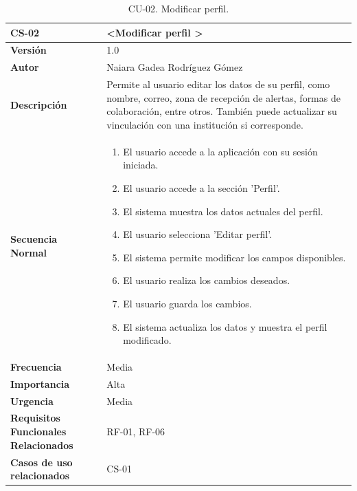 \begin{table}[htbp] %
\centering
\begin{tabular}{ |m{3cm}|m{11cm}|  } 
\hline
\cellcolor[HTML]{B9E3F0}\centering\textbf{CS-02} & \cellcolor[HTML]{B9E3F0}\textbf{\textless Modificar perfil \textgreater}\\

\hline
\cellcolor[HTML]{EFEFEF}\textbf{Versión}             & 1.0  \\
\hline
\cellcolor[HTML]{EFEFEF}\textbf{Autor}                & Naiara Gadea Rodríguez Gómez\\
\hline
\cellcolor[HTML]{EFEFEF}\textbf{Descripción}                & { Permite al usuario editar los datos de su perfil, como nombre, correo, zona de recepción de alertas, formas de colaboración, entre otros. También puede actualizar su vinculación con una institución si corresponde. }\\
\hline
\cellcolor[HTML]{EFEFEF}\textbf{Secuencia \newline Normal}                &                 
        \begin{enumerate}
            \item El usuario accede a la aplicación con su sesión iniciada.
            \item El usuario accede a la sección 'Perfil'.
            \item El sistema muestra los datos actuales del perfil.
            \item El usuario selecciona 'Editar perfil'.
            \item El sistema permite modificar los campos disponibles.
            \item El usuario realiza los cambios deseados.
            \item El usuario guarda los cambios.
            \item El sistema actualiza los datos y muestra el perfil modificado.
        \end{enumerate}\\
\hline
\cellcolor[HTML]{EFEFEF}\textbf{Frecuencia}                & Media\\
\hline
\cellcolor[HTML]{EFEFEF}\textbf{Importancia}                & Alta\\
\hline
\cellcolor[HTML]{EFEFEF}\textbf{Urgencia}                & Media\\
\hline
\cellcolor[HTML]{EFEFEF}\textbf{Requisitos Funcionales Relacionados}                & { RF-01, RF-06 }\\
\hline
\cellcolor[HTML]{EFEFEF}\textbf{Casos de uso relacionados}                & { CS-01 }\\
\hline
\end{tabular}
\caption{CU-02. Modificar perfil.}
\end{table}


